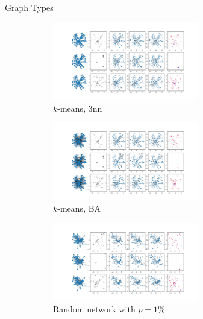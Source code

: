 \documentclass[aspectratio=169]{beamer}
\begin{document}
\begin{frame}[plain]{Graph Types}
\begin{figure}[htbp]
        \begin{subfigure}{0.24\textwidth}
            \centering
            \includegraphics[trim={4.8cm 13.2cm 29.3cm 2.4cm},clip,width=0.7\textwidth]{../results/pdfs/nn-100N-noemb-fixed}
            \caption{$k$-means, 3nn}
        \end{subfigure}
        \begin{subfigure}{0.24\textwidth}
            \centering
            \includegraphics[trim={4.8cm 13.2cm 29.3cm 2.4cm},clip,width=0.7\textwidth]{../results/pdfs/ba-100N-noemb-fixed}
            \caption{$k$-means, BA}
        \end{subfigure}
        \pause
        \begin{subfigure}{0.24\textwidth}
            \centering
            \includegraphics[trim={4.8cm 13.2cm 29.3cm 2.4cm},clip,width=0.7\textwidth]{../results/pdfs/rn1-100N-noemb0}
            \caption{Random network with $p=1\%$}
        \end{subfigure}
        \begin{subfigure}{0.24\textwidth}

\end{subfigure}
\end{figure}
\end{frame}
\end{document}
